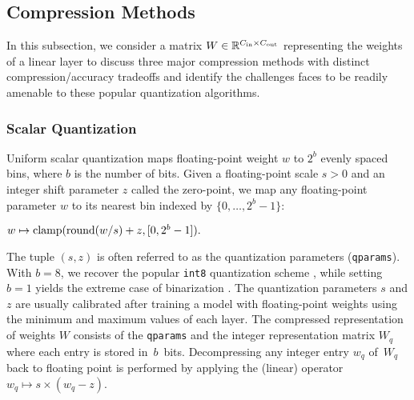 

\subsection{Compression Methods}
\label{subsec:comp_methods}
In this subsection, we consider a matrix $W \in \mathbb{R}^{C_{\text{in}}\times C_{\text{out}}}$ representing the weights of a linear layer to discuss three major compression methods with distinct compression/accuracy tradeoffs and identify the challenges \SecAgg faces to be readily amenable to these popular quantization algorithms.

\subsubsection{Scalar Quantization}
\label{subsec:sq}

 Uniform scalar quantization maps floating-point weight $w$ to $2^b$ evenly spaced bins, where $b$ is the number of bits. Given a floating-point scale $s > 0$ and an integer shift parameter $z$ called the zero-point, we map any floating-point parameter $w$ to its nearest bin indexed by $\{0,\dots, 2^b-1\}$:

\centerline{$w \mapsto \operatorname{clamp}(\operatorname{round}(w /s) + z, [0, 2^b - 1] ).$}

%
The tuple $(s, z)$ is often referred to as the quantization parameters (\texttt{qparams}).
With $b=8$, we recover the popular \texttt{int8} quantization scheme \cite{jacob2017quantization}, while setting $b = 1$ yields the extreme case of binarization \cite{courbariaux2015binaryconnect}.
The quantization parameters $s$ and $z$ are usually calibrated after training a model with floating-point weights using the minimum and maximum values of each layer.
The compressed representation of weights $W$ consists of the \texttt{qparams} and the integer representation matrix $W_q$ where each entry is stored in~$b$~bits.
Decompressing any integer entry $w_q$ of~$W_q$ back to floating point is performed by applying  the (linear) operator $w_q \mapsto s\times(w_q - z)$.

